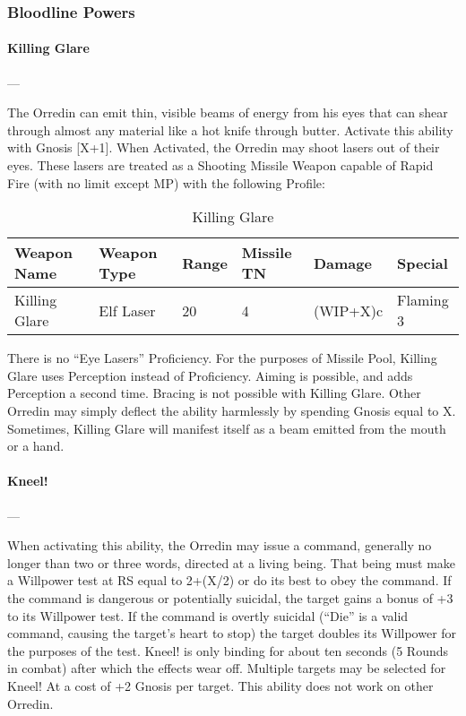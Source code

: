 \documentclass[oneside,11pt,english]{book}
\begin{document}
\subsubsection{Bloodline Powers}
\paragraph{\large\label{man:Killing Glare} Killing Glare}---\quad{\large[X+1]}\par
The Orredin can emit thin, visible beams of energy from his eyes that can shear through almost any material like a hot knife through butter. Activate this ability with Gnosis [X+1].
When Activated, the Orredin may shoot lasers out of their eyes. These lasers are treated as a Shooting 
Missile Weapon capable of Rapid Fire (with no limit except MP) with the following Profile:
\begin{table}[!ht]
	\caption{Killing Glare}
	\label{tab:Killing Glare}
	\begin{tabu} to \textwidth {XXX[-1,c]X[c]XX}
Weapon Name&Weapon Type&Range& Missile TN&Damage&Special\\\toprule
Killing Glare&Elf Laser&20&4&(WIP+X)c&Flaming 3\\
	\end{tabu}
\end{table}

There is no “Eye Lasers” Proficiency. For the purposes of Missile Pool, Killing Glare uses Perception instead of Proficiency. Aiming is possible, and adds Perception a second time. Bracing is not possible with Killing Glare. Other Orredin may simply deflect the ability harmlessly by spending Gnosis equal to X. Sometimes, Killing Glare will manifest itself as a beam emitted from the mouth or a hand.

\paragraph{\large\label{man:Kneel!} Kneel!}---\quad{\large[X]}\par
When activating this ability, the Orredin may issue a command, generally no longer than two or three words, directed at a living being. That being must make a Willpower test at RS equal to 2+(X/2) or do its best to obey the command. If the command is dangerous or potentially suicidal, the target gains a bonus of +3 to its Willpower test. If the command is overtly suicidal (“Die” is a valid command, causing the 
target’s heart to stop) the target doubles its Willpower for the purposes of the test. Kneel! is only binding 
for about ten seconds (5 Rounds in combat) after which the effects wear off. Multiple targets may be selected for Kneel! At a cost of +2 Gnosis per target. This ability does not work on other Orredin. 
\end{document}
